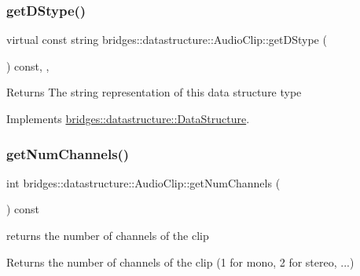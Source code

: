 \subsubsection{\texorpdfstring{get\+D\+Stype()}{getDStype()}}
{\footnotesize\ttfamily virtual const string bridges\+::datastructure\+::\+Audio\+Clip\+::get\+D\+Stype (\begin{DoxyParamCaption}{ }\end{DoxyParamCaption}) const\hspace{0.3cm}{\ttfamily [inline]}, {\ttfamily [override]}, {\ttfamily [virtual]}}

\begin{DoxyReturn}{Returns}
The string representation of this data structure type 
\end{DoxyReturn}


Implements \hyperlink{classbridges_1_1datastructure_1_1_data_structure_a4ff66cb34409f11fe9fc647f6d8a22ce}{bridges\+::datastructure\+::\+Data\+Structure}.

\mbox{\label{classbridges_1_1datastructure_1_1_audio_clip_acc378f797b1b6e3cfb778c1ccdc23dba}} 
\subsubsection{\texorpdfstring{get\+Num\+Channels()}{getNumChannels()}}
{\footnotesize\ttfamily int bridges\+::datastructure\+::\+Audio\+Clip\+::get\+Num\+Channels (\begin{DoxyParamCaption}{ }\end{DoxyParamCaption}) const\hspace{0.3cm}{\ttfamily [inline]}}



returns the number of channels of the clip 

\begin{DoxyReturn}{Returns}
the number of channels of the clip (1 for mono, 2 for stereo, ...) 
\end{DoxyReturn}
\mbox{\label{classbridges_1_1datastructure_1_1_audio_clip_a24bd273de32369cb9d979e7250759717}} 
